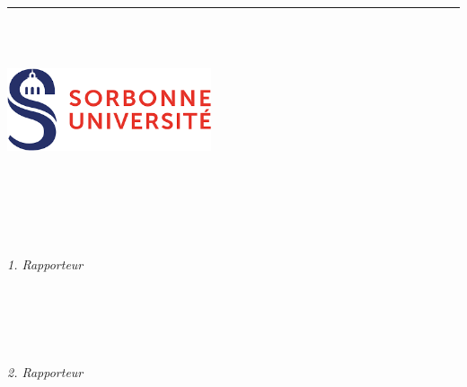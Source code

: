 
%
\begin{titlepage}
	\flushright
	\hfill
	\vfill
	{\LARGE\thesisTitle \par}
	\rule[5pt]{\textwidth}{.4pt} \par
	{\Large\thesisName}
	\vfill
	\textit{\large\thesisDate} \\
\end{titlepage}


\begin{titlepage}
	\tgherosfont
	\centering

	{\Large \thesisUniversity} \\[4mm]
	\includegraphics[width=6cm]{gfx/SU-logo.png} \\[2mm]
	\textsf{\thesisUniversityDepartment} \\
	\textsf{\thesisUniversityInstitute} \\

	\vfill
	{\large \thesisSubject} \\[5mm]
	{\LARGE \color{ctcolortitle}\textbf{\thesisTitle} \\[10mm]}
	{\Large \thesisName} \\

	\vfill
	\begin{minipage}[t]{.27\textwidth}
		\raggedleft
		\textit{1. Rapporteur}
	\end{minipage}
	\hspace*{15pt}
	\begin{minipage}[t]{.65\textwidth}
		{\Large \thesisFirstReviewer} \\
	  	{\small \thesisFirstReviewerDepartment} \\[-1mm]
		{\small \thesisFirstReviewerUniversity}
	\end{minipage} \\[5mm]
	\begin{minipage}[t]{.27\textwidth}
		\raggedleft
		\textit{2. Rapporteur}
	\end{minipage}
	\hspace*{15pt}
	\begin{minipage}[t]{.65\textwidth}
		{\Large \thesisSecondReviewer} \\
	  	{\small \thesisSecondReviewerDepartment} \\[-1mm]
		{\small \thesisSecondReviewerUniversity}
	\end{minipage} \\[10mm]
	

\end{titlepage}
